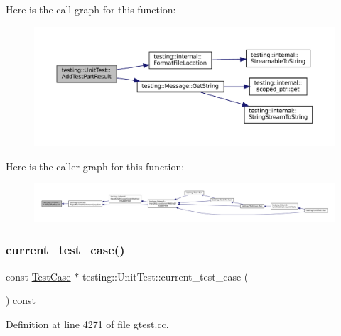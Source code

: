 Here is the call graph for this function\+:
\nopagebreak
\begin{figure}[H]
\begin{center}
\leavevmode
\includegraphics[width=350pt]{classtesting_1_1UnitTest_a1d157d2e9a5c1d3405333410c6b13932_cgraph}
\end{center}
\end{figure}
Here is the caller graph for this function\+:
\nopagebreak
\begin{figure}[H]
\begin{center}
\leavevmode
\includegraphics[width=350pt]{classtesting_1_1UnitTest_a1d157d2e9a5c1d3405333410c6b13932_icgraph}
\end{center}
\end{figure}
\mbox{\label{classtesting_1_1UnitTest_a2bf61896036ae03edbd7bceed14f9e18}} 
\subsubsection{\texorpdfstring{current\+\_\+test\+\_\+case()}{current\_test\_case()}}
{\footnotesize\ttfamily const \hyperlink{classtesting_1_1TestCase}{Test\+Case} $\ast$ testing\+::\+Unit\+Test\+::current\+\_\+test\+\_\+case (\begin{DoxyParamCaption}{ }\end{DoxyParamCaption}) const}



Definition at line 4271 of file gtest.\+cc.


